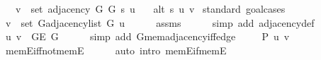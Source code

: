 \begin{isabellebody}
\ \ \ {\isachardoublequoteopen}v\ {\isasymin}\ set\ {\isacharparenleft}{\kern0pt}adjacency\ G{}\ G{}\ s\ u{\isacharparenright}{\kern0pt}{\isachardoublequoteclose}\isanewline
\ \ \ {\isachardoublequoteopen}alt\ s\ u\ v{\isachardoublequoteclose}%
\endisataginvisible
{\isafoldinvisible}%
%
\isadeliminvisible
\isanewline
%
\endisadeliminvisible
%
\isadelimproof
%
\endisadelimproof
%
\isatagproof
{}\isamarkupfalse%
\ {\isacharparenleft}{\kern0pt}standard{\isacharcomma}{\kern0pt}\ goal{\isacharunderscore}{\kern0pt}cases{\isacharparenright}{\kern0pt}\isanewline
\ \ \isamarkupfalse%
\ {}\isanewline
\ \ \isamarkupfalse%
\ {\isachardoublequoteopen}v\ {\isasymin}\ set\ {\isacharparenleft}{\kern0pt}G{\isachardot}{\kern0pt}adjacency{\isacharunderscore}{\kern0pt}list\ G{}\ u{\isacharparenright}{\kern0pt}{\isachardoublequoteclose}\isanewline
\ \ \ \ \isamarkupfalse%
\ assms\isanewline
\ \ \ \ \isamarkupfalse%
\ {\isacharparenleft}{\kern0pt}simp\ add{\isacharcolon}{\kern0pt}\ adjacency{\isacharunderscore}{\kern0pt}def{\isacharparenright}{\kern0pt}\isanewline
\ \ \isamarkupfalse%
\ {\isachardoublequoteopen}{\isacharbraceleft}{\kern0pt}u{\isacharcomma}{\kern0pt}\ v{\isacharbraceright}{\kern0pt}\ {\isasymin}\ G{\isachardot}{\kern0pt}E\ G{}{\isachardoublequoteclose}\isanewline
\ \ \ \ \isamarkupfalse%
\ {\isacharparenleft}{\kern0pt}simp\ add{\isacharcolon}{\kern0pt}\ G{}{\isachardot}{\kern0pt}mem{\isacharunderscore}{\kern0pt}adjacency{\isacharunderscore}{\kern0pt}iff{\isacharunderscore}{\kern0pt}edge{\isacharparenright}{\kern0pt}\isanewline
\ \ \isamarkupfalse%
\ {\isachardoublequoteopen}{\isasymnot}\ P{\isacharprime}{\kern0pt}{\isacharprime}{\kern0pt}\ {\isacharbraceleft}{\kern0pt}u{\isacharcomma}{\kern0pt}\ v{\isacharbraceright}{\kern0pt}{\isachardoublequoteclose}\isanewline
\ \ \ \ \isamarkupfalse%
\ mem{\isacharunderscore}{\kern0pt}E{}{\isacharunderscore}{\kern0pt}iff{\isacharunderscore}{\kern0pt}not{\isacharunderscore}{\kern0pt}mem{\isacharunderscore}{\kern0pt}E{}\isanewline
\ \ \ \ \isamarkupfalse%
\ {\isacharparenleft}{\kern0pt}auto\ intro{\isacharcolon}{\kern0pt}\ mem{\isacharunderscore}{\kern0pt}E{\isacharunderscore}{\kern0pt}if{\isacharunderscore}{\kern0pt}mem{\isacharunderscore}{\kern0pt}E{}{\isacharparenright}{\kern0pt}\isanewline
\ \ \isamarkupfalse%

\end{isabellebody}
